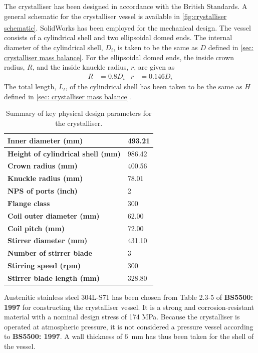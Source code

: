 The crystalliser has been designed in accordance with the British Standards. A general schematic for the crystalliser vessel is available in \cref{fig:crystalliser schematic}.  SolidWorks\textsuperscript{\textregistered} has been employed for the mechanical design. The vessel consists of a cylindrical shell and two ellipsoidal domed ends. The internal diameter of the cylindrical shell, $D_i$, is taken to be the same as $D$ defined in \cref{sec: crystalliser mass balance}. For the ellipsoidal domed ends, the inside crown radius, $R$, and the inside knuckle radius, $r$, are given as 
\begin{align}
    R &= 0.8 D_i &
    r &= 0.146 D_i
\end{align}
The total length, $L_t$, of the cylindrical shell has been taken to be the same as $H$ defined in \cref{sec: crystalliser mass balance}. 

\begin{table}
\centering
\caption{Summary of key physical design parameters for the crystalliser.}
 \label{tab:crystalliser mech design summary}
\begin{tabular}{@{}l|l@{}}
\toprule
\textbf{Inner diameter (mm)}                &    493.21 \\ \midrule
\textbf{Height of cylindrical shell (mm)}   & 986.42 \\ \midrule
\textbf{Crown radius (mm)}                  & 400.56 \\ \midrule
\textbf{Knuckle radius (mm)}                & 78.01 \\ \midrule
\textbf{NPS of ports (inch)}                & 2 \\ \midrule
\textbf{Flange class}                       & 300 \\ \midrule
\textbf{Coil outer diameter (mm)}           & 62.00 \\ \midrule
\textbf{Coil pitch (mm)}                    & 72.00 \\ \midrule
\textbf{Stirrer diameter (mm)}              & 431.10 \\ \midrule
\textbf{Number of stirrer blade}            & 3 \\ \midrule
\textbf{Stirring speed (rpm)}               & 300 \\ \midrule
\textbf{Stirrer blade length (mm)}          & 328.80 \\ \bottomrule
\end{tabular}
\end{table}

Austenitic stainless steel 304L-S71 has been chosen from Table 2.3-5 of \textbf{BS5500: 1997} for constructing the crystalliser vessel. It is a strong and corrosion-resistant material with a nominal design stress of 174 MPa. Because the crystalliser is operated at atmospheric pressure, it is not considered a pressure vessel according to \textbf{BS5500: 1997}. A wall thickness of \SI{6}{\mm} has thus been taken for the shell of the vessel.

